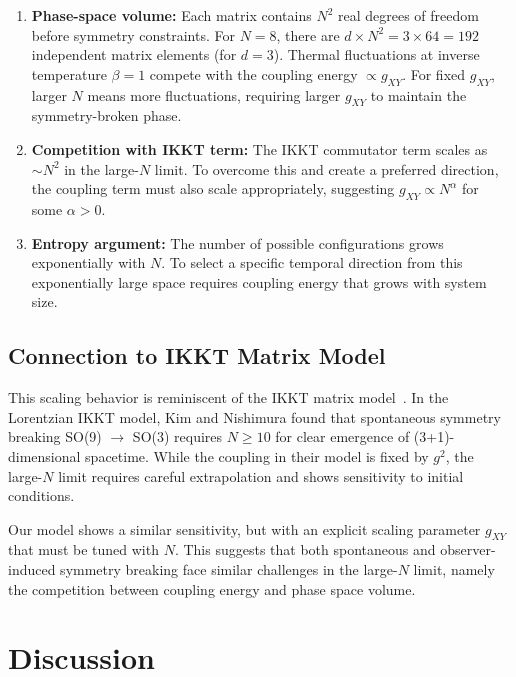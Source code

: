 \documentclass[12pt,a4paper]{article}
\begin{document}
\begin{enumerate}[leftmargin=*]
\item \textbf{Phase-space volume:}
Each matrix contains $N^2$ real degrees of freedom before symmetry constraints.
For $N=8$, there are $d \times N^2 = 3 \times 64 = 192$ independent
matrix elements (for $d=3$). Thermal fluctuations at inverse temperature
$\beta = 1$ compete with the coupling energy $\propto g_{XY}$. For fixed
$g_{XY}$, larger $N$ means more fluctuations, requiring larger $g_{XY}$ to
maintain the symmetry-broken phase.

\item \textbf{Competition with IKKT term:}
The IKKT commutator term scales as $\sim N^2$ in the large-$N$ limit. To
overcome this and create a preferred direction, the coupling term must also
scale appropriately, suggesting $g_{XY} \propto N^\alpha$ for some $\alpha > 0$.

\item \textbf{Entropy argument:}
The number of possible configurations grows exponentially with $N$. To select
a specific temporal direction from this exponentially large space requires
coupling energy that grows with system size.
\end{enumerate}

\subsection{Connection to IKKT Matrix Model}

This scaling behavior is reminiscent of the IKKT matrix
model~\cite{kim_nishimura_2011, kim_nishimura_2019}. In the Lorentzian IKKT
model, Kim and Nishimura found that spontaneous symmetry breaking
SO(9) $\rightarrow$ SO(3) requires $N \geq 10$ for clear emergence of
(3+1)-dimensional spacetime. While the coupling in their model is fixed by
$g^2$, the large-$N$ limit requires careful extrapolation and shows
sensitivity to initial conditions.

Our model shows a similar sensitivity, but with an explicit scaling parameter
$g_{XY}$ that must be tuned with $N$. This suggests that both spontaneous and
observer-induced symmetry breaking face similar challenges in the large-$N$
limit, namely the competition between coupling energy and phase space volume.

\section{Discussion}\label{sec:discussion}
\end{document}
